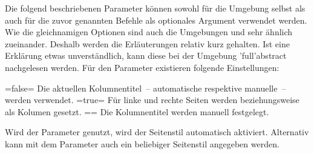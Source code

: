 \begin{DeclareEntity*}{}
\begin{DeclareEntity*}{}
\begin{DeclareEntity*}{}
\begin{Declaration}
\begin{Declaration}
\begin{Declaration}
\begin{Declaration}
\begin{Declaration}
\begin{Declaration}
\begin{Declaration}
\begin{Declaration}
\begin{Declaration}
\begin{Declaration}
\begin{Declaration}
Die folgend beschriebenen Parameter können sowohl für die Umgebung 
 selbst als auch für die zuvor genannten Befehle als 
optionales Argument verwendet werden. Wie die gleichnamigen Optionen sind auch 
die Umgebungen  und  sehr 
ähnlich zueinander. Deshalb werden die Erläuterungen relativ kurz gehalten. Ist 
eine Erklärung etwas unverständlich, kann diese bei der Umgebung 
\Environment'full'{abstract} nachgelesen werden.
%
%
Für den Parameter  existieren folgende 
Einstellungen:%
%
\begin{DeclareValues}
\itemval=false=
  Die aktuellen Kolumnentitel~-- automatische respektive manuelle~-- werden 
  verwendet.
\itemval*=true=
  Für linke und rechte Seiten werden  beziehungsweise 
   als Kolumen gesetzt.
\itemval==
  Die Kolumnentitel werden manuell festgelegt.
\end{DeclareValues}

Wird der Parameter  genutzt, wird der 
Seitenstil  automatisch aktiviert. Alternativ kann mit dem 
Parameter  auch ein beliebiger Seitenstil 
angegeben werden. 


\end{Declaration}
\end{Declaration}
\end{Declaration}
\end{Declaration}
\end{Declaration}
\end{Declaration}
\end{Declaration}
\end{Declaration}
\end{Declaration}
\end{Declaration}
\end{Declaration}
\end{DeclareEntity*}
\end{DeclareEntity*}
\end{DeclareEntity*}
